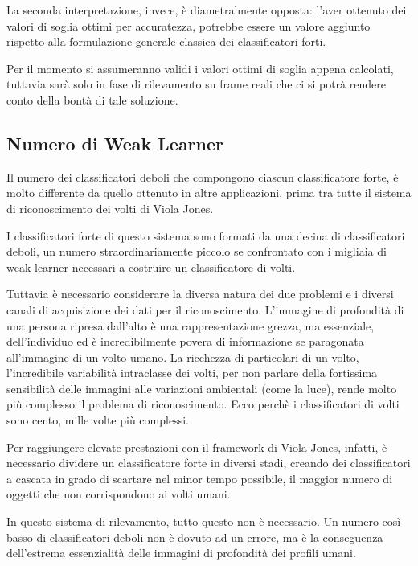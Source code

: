                 La seconda interpretazione, invece, è diametralmente opposta: l'aver ottenuto dei valori di soglia ottimi per accuratezza, potrebbe essere un valore aggiunto rispetto alla formulazione generale classica dei classificatori forti.

                Per il momento si assumeranno validi i valori ottimi di soglia appena calcolati, tuttavia sarà solo in fase di rilevamento su frame reali che ci si potrà rendere conto della bontà di tale soluzione.

            \subsection{Numero di Weak Learner} %
            \label{sub:numero_di_weak_learner}
                Il numero dei classificatori deboli che compongono ciascun classificatore forte, è molto differente da quello ottenuto in altre applicazioni, prima tra tutte il sistema di riconoscimento dei volti di Viola Jones.

                I classificatori forte di questo sistema sono formati da una decina di classificatori deboli, un numero straordinariamente piccolo se confrontato con i migliaia di weak learner necessari a costruire un classificatore di volti.

                Tuttavia è necessario considerare la diversa natura dei due problemi e i diversi canali di acquisizione dei dati per il riconoscimento. L'immagine di profondità di una persona ripresa dall'alto è una rappresentazione grezza, ma essenziale, dell'individuo ed è incredibilmente povera di informazione se paragonata all'immagine di un volto umano.
                La ricchezza di particolari di un volto, l'incredibile variabilità intraclasse dei volti, per non parlare della fortissima sensibilità delle immagini alle variazioni ambientali (come la luce), rende molto più complesso il problema di riconoscimento. Ecco perchè i classificatori di volti sono cento, mille volte più complessi.

                Per raggiungere elevate prestazioni con il framework di Viola-Jones, infatti, è necessario dividere un classificatore forte in diversi stadi, creando dei classificatori a cascata in grado di scartare nel minor tempo possibile, il maggior numero di oggetti che non corrispondono ai volti umani.

                In questo sistema di rilevamento, tutto questo non è necessario. Un numero così basso di classificatori deboli non è dovuto ad un errore, ma è la conseguenza dell'estrema essenzialità delle immagini di profondità dei profili umani.
                
